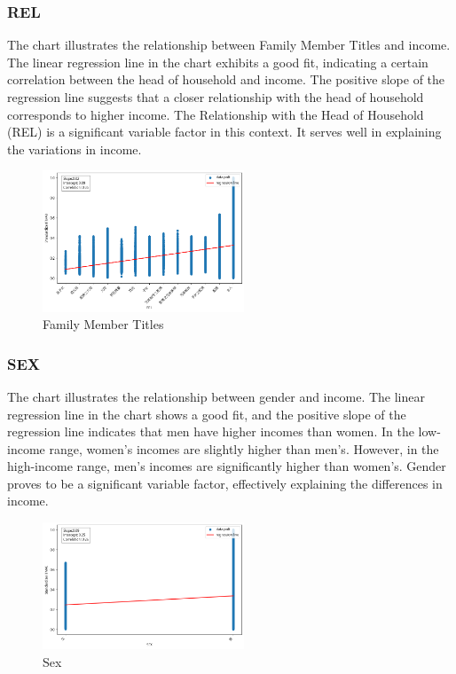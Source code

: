 \documentclass[twocolumn]{article}
\begin{document}
		\subsubsection{REL}
The chart illustrates the relationship between Family Member Titles and income. The linear regression line in the chart exhibits a good fit, indicating a certain correlation between the head of household and income. The positive slope of the regression line suggests that a closer relationship with the head of household corresponds to higher income.
The Relationship with the Head of Household (REL) is a significant variable factor in this context. It serves well in explaining the variations in income.
		\begin{figure}[H]
		\centering
		\includegraphics[width=6cm]{REL.png} 
		\caption{Family Member Titles} 
		\label{Fig.REL} 
		\end{figure}
		
		\subsubsection{SEX}
The chart illustrates the relationship between gender and income. The linear regression line in the chart shows a good fit, and the positive slope of the regression line indicates that men have higher incomes than women. In the low-income range, women's incomes are slightly higher than men's. However, in the high-income range, men's incomes are significantly higher than women's. Gender proves to be a significant variable factor, effectively explaining the differences in income.
		\begin{figure}[H]
		\centering
		\includegraphics[width=6cm]{SEX.png} 
		\caption{Sex} 
		\label{Fig.SEX} 
		\end{figure}
\end{document}
